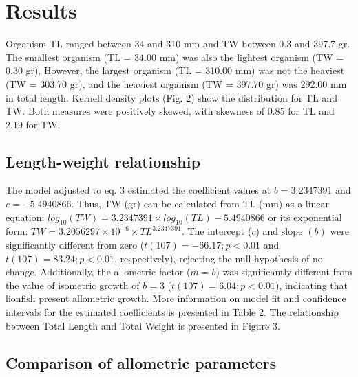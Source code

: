 \documentclass[12pt,]{article}
\begin{document}
\section{Results}\label{results}

Organism TL ranged between 34 and 310 mm and TW between 0.3 and 397.7
gr. The smallest organism (TL = 34.00 mm) was also the lightest organism
(TW = 0.30 gr). However, the largest organism (TL = 310.00 mm) was not
the heaviest (TW = 303.70 gr), and the heaviest organism (TW = 397.70
gr) was 292.00 mm in total length. Kernell density plots (Fig. 2) show
the distribution for TL and TW. Both measures were positively skewed,
with skewness of 0.85 for TL and 2.19 for TW.

\subsection{Length-weight
relationship}\label{length-weight-relationship}

The model adjusted to eq. 3 estimated the coefficient values at
\(b = 3.2347391\) and \(c = -5.4940866\). Thus, TW (gr) can be
calculated from TL (mm) as a linear equation:
\(log_{10}(TW) = 3.2347391\times log_{10}(TL) -5.4940866\) or its
exponential form: \(TW = 3.2056297\times 10^{-6}\times TL^{3.2347391}\).
The intercept (\(c\)) and slope \((b)\) were significantly different
from zero (\(t(107) = -66.17; p<0.01\) and \(t(107) = 83.24; p<0.01\),
respectively), rejecting the null hypothesis of no change. Additionally,
the allometric factor (\(m = b\)) was significantly different from the
value of isometric growth of \(b = 3\) (\(t(107) = 6.04; p<0.01\)),
indicating that lionfish present allometric growth. More information on
model fit and confidence intervals for the estimated coefficients is
presented in Table 2. The relationship between Total Length and Total
Weight is presented in Figure 3.

\subsection{Comparison of allometric
parameters}\label{comparison-of-allometric-parameters}
\end{document}
